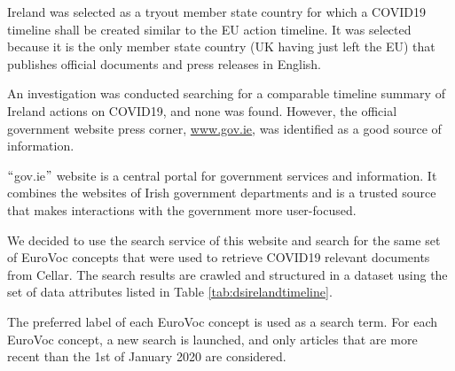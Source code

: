Ireland was selected as a tryout member state country for which a COVID19 timeline shall be created similar to the EU action timeline. It was selected because it is the only member state country (UK having just left the EU) that publishes official documents and press releases in English. 

An investigation was conducted searching for a comparable timeline summary of Ireland actions on COVID19, and none was found. However, the official government website press corner, \href{http://www.gov.ie}{\textcolor[HTML]{1155CC}{\ul{www.gov.ie}}}, was identified as a good source of information. 

$``$gov.ie$"$  website is a central portal for government services and information. It combines the websites of Irish government departments and is a trusted source that makes interactions with the government more user-focused.

We decided to use the search service of this website and search for the same set of EuroVoc concepts that were used to retrieve COVID19 relevant documents from Cellar. The search results are crawled and structured in a dataset using the set of data attributes listed in  Table \ref{tab:dsirelandtimeline}. 

The preferred label of each EuroVoc concept is used as a search term. For each EuroVoc concept, a new search is launched, and only articles that are more recent than the 1st of January 2020 are considered.

